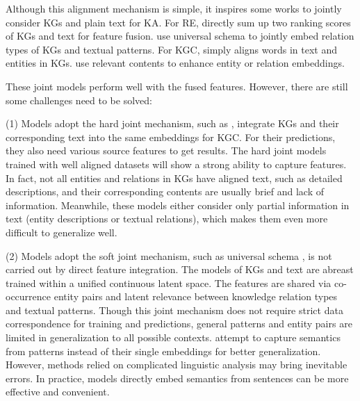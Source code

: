 \documentclass[letterpaper]{article} %
\begin{document}
Although this alignment mechanism is simple, it inspires some works to jointly consider KGs and plain text for KA. 
For RE, \cite{weston2013connecting} directly sum up two ranking scores of KGs and text for feature fusion. \cite{riedel2013relation,vergamccallum} use universal schema to jointly embed relation types of KGs and textual patterns. For KGC, \cite{wang2014knowledge} simply aligns words in text and entities in KGs. \cite{toutanova2015representing,xie2016representation} use relevant contents to enhance entity or relation embeddings. 

These joint models perform well with the fused features. However, there are still some challenges need to be solved:

(1) Models adopt the hard joint mechanism, such as \cite{zhong2015aligning}, integrate KGs and their corresponding text into the same embeddings for KGC. For their predictions, they also need various source features to get results. The hard joint models trained with well aligned datasets will show a strong ability to capture features. In fact, not all entities and relations in KGs have aligned text, such as detailed descriptions, and their corresponding contents are usually brief and lack of information. Meanwhile, these models either consider only partial information in text (entity descriptions or textual relations), which makes them even more difficult to generalize well.


(2) Models adopt the soft joint mechanism, such as universal schema \cite{riedel2013relation}, is not carried out by direct feature integration. The models of KGs and text are abreast trained within a unified continuous latent space. The features are shared via co-occurrence entity pairs and latent relevance between knowledge relation types and textual patterns. Though this joint mechanism does not require strict data correspondence for training and predictions, general patterns and entity pairs are limited in generalization to all possible contexts. \cite{vergaEtAl,vergamccallum} attempt to capture semantics from patterns instead of their single embeddings for better generalization. However, methods relied on complicated linguistic analysis may bring inevitable errors. In practice, models directly embed semantics from sentences can be more effective and convenient.
 
\end{document}

